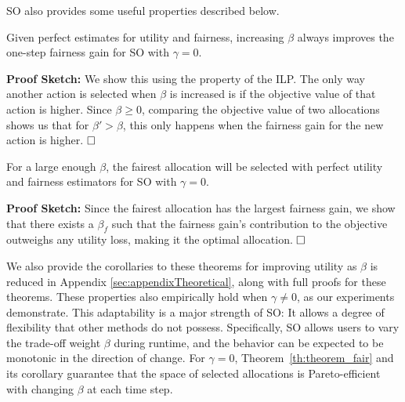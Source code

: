 SO also provides some useful properties described below.
\begin{theorem}
\label{th:theorem_fair}
Given perfect estimates for utility and fairness, increasing $\beta$ always improves the one-step fairness gain for SO with $\gamma=0$.
\end{theorem}
\noindent \textbf{Proof Sketch:} We show this using the property of the ILP. The only way another action is selected when $\beta$ is increased is if the objective value of that action is higher. Since $\beta\ge0$, comparing the objective value of two allocations shows us that for $\beta'>\beta$, this only happens when the fairness gain for the new action is higher. $\hfill \Box$

\begin{theorem}
\label{th:theorem_fairest}
For a large enough $\beta$, the fairest allocation will be selected with perfect utility and fairness estimators for SO with $\gamma=0$.
\end{theorem}
\noindent \textbf{Proof Sketch:}
Since the fairest allocation has the largest fairness gain, we show that there exists a $\beta_f$ such that the fairness gain's contribution to the objective outweighs any utility loss, making it the optimal allocation. $\hfill \Box$

\medskip
We also provide the corollaries to these theorems for improving utility as $\beta$ is reduced in Appendix \ref{sec:appendixTheoretical}, along with full proofs for these theorems. 
These properties also empirically hold when $\gamma\ne0$, as our experiments demonstrate. This adaptability is a major strength of SO: It allows a degree of flexibility that other methods do not possess. Specifically, SO allows users to vary the trade-off weight $\beta$ during runtime, and the behavior can be expected to be monotonic in the direction of change. For $\gamma=0$, Theorem~\ref{th:theorem_fair} and its corollary guarantee that the space of selected allocations is Pareto-efficient with changing $\beta$ at each time step.
